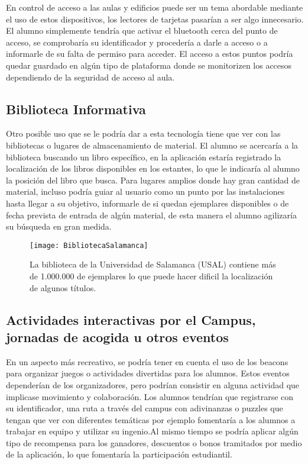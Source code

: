 En control de acceso a las aulas y edificios puede ser un tema abordable mediante el uso de estos dispositivos, los lectores de tarjetas pasarían a ser algo innecesario. El alumno simplemente tendría que activar el bluetooth cerca del punto de acceso, se comprobaría su identificador y procedería a darle a acceso o a informarle de su falta de permiso para acceder. El acceso a estos puntos podría quedar guardado en algún tipo de plataforma donde se monitorizen los accesos dependiendo de la seguridad de acceso al aula.

\subsection{Biblioteca Informativa}

Otro posible uso que se le podría dar a esta tecnología tiene que ver con las bibliotecas o lugares de almacenamiento de material. El alumno se acercaría a la biblioteca buscando un libro específico, en la aplicación estaría registrado la localización de los libros disponibles en los estantes, lo que le indicaría al alumno la posición del libro que busca. Para lugares amplios donde hay gran cantidad de material, incluso podría guiar al usuario como un punto por las instalaciones hasta llegar a su objetivo, informarle de si quedan ejemplares disponibles o de fecha prevista de entrada de algún material, de esta manera el alumno agilizaría su búsqueda en gran medida.

\begin{figure}[H]
	\centering
	\texttt{[image: BibliotecaSalamanca]}
	\caption{La biblioteca de la Universidad de Salamanca (USAL) contiene más de 1.000.000 de ejemplares lo que puede hacer dificil la localización de algunos títulos.}
	\label{fig:bibliotecaUSAL}
\end{figure}

\subsection{Actividades interactivas por el Campus, jornadas de acogida u otros eventos}

En un aspecto más recreativo, se podría tener en cuenta el uso de los beacons para organizar juegos o actividades divertidas para los alumnos. Estos eventos dependerían de los organizadores, pero podrían consistir en alguna actividad que implicase movimiento y colaboración. Los alumnos tendrían que registrarse con su identificador, una ruta a través del campus con adivinanzas o puzzles que tengan que ver con diferentes temáticas por ejemplo fomentaría a los alumnos a trabajar en equipo y utilizar su ingenio.Al mismo tiempo se podría aplicar algún tipo de recompensa para los ganadores, descuentos o bonos tramitados por medio de la aplicación, lo que fomentaría la participación estudiantil.

